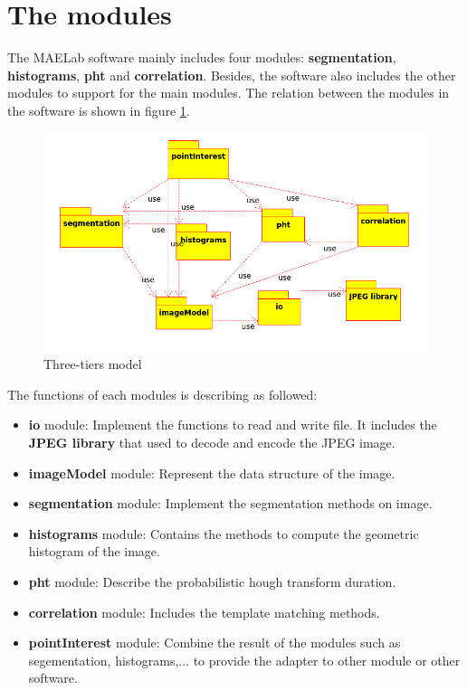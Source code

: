 \section{The modules}
The MAELab software mainly includes four modules: \textbf{segmentation}, \textbf{histograms}, \textbf{pht} and \textbf{correlation}. Besides, the software also includes the other modules to support for the main modules. The relation between the modules in the software is shown in figure \ref{fignsmodules}.
\begin{figure}[h]
	\centering
	\includegraphics[scale=0.5]{images/modules}
	\caption{Three-tiers model}
	\label{fignsmodules}
\end{figure}
The functions of each modules is describing as followed:
\begin{itemize}
	\item \textbf{io} module: Implement the functions to read and write file. It includes the \textbf{JPEG library} that used to decode and encode the JPEG image.
	\item \textbf{imageModel} module: Represent the data structure of the image.
	\item \textbf{segmentation} module: Implement the segmentation methods on image.
	\item \textbf{histograms} module: Contains the methods to compute the geometric histogram of the image.
	\item \textbf{pht} module: Describe the probabilistic hough transform duration.
	\item \textbf{correlation} module: Includes the template matching methods.
	\item \textbf{pointInterest} module: Combine the result of the modules such as segementation, histograms,... to provide the adapter to other module or other software.
\end{itemize}
